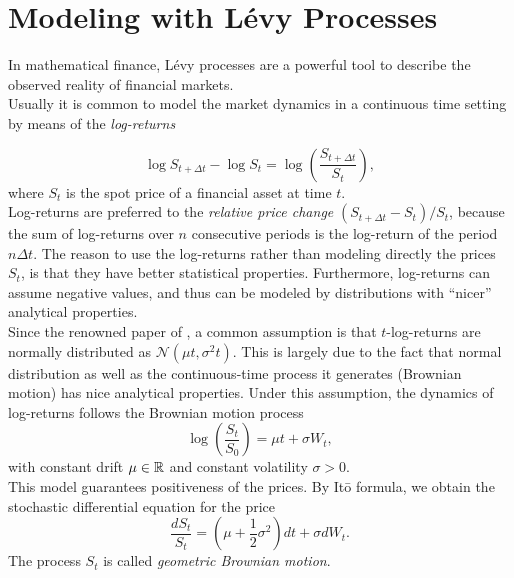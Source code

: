 

\chapter{Modeling with Lévy Processes}\label{Chapter1}
\minitoc%


\vspace{5em}

In mathematical finance, Lévy processes are a powerful tool to describe the observed reality of financial markets.\\ 
Usually it is common to model the market dynamics in a continuous time setting by means of the \emph{log-returns}

\begin{equation}
 \log S_{t+\Delta t} - \log S_t = \log \left(\frac{S_{t+\Delta t}}{S_t}\right),
\end{equation}
where $S_t$ is the spot price of a financial asset at time $t$.\\
Log-returns are preferred to the \emph{relative price change} $(S_{t+\Delta t} - S_t )/S_t$, because the sum of log-returns 
over $n$ consecutive periods is the log-return of the period $n \Delta t$.
The reason to use the log-returns rather than modeling directly the prices $S_t$, is that they have better statistical properties.
Furthermore, log-returns can assume negative values, and thus can be modeled by distributions
with ``nicer'' analytical properties.\\
Since the renowned paper of \cite{BS73}, a common assumption is that $t$-log-returns are 
normally distributed as $\mathcal{N}(\mu t,\sigma^2 t)$. 
This is largely due to the fact that normal distribution as well as the continuous-time process
it generates (Brownian motion) has nice analytical properties.
Under this assumption, the dynamics  of log-returns follows the Brownian motion process
\begin{equation}\label{GBM}
 \log \left( \frac{S_t}{S_0} \right) = \mu t + \sigma W_t ,
\end{equation}
with constant drift $\mu \in \mathbb{R}$ and constant volatility $\sigma >0$.\\
This model guarantees positiveness of the prices. By It\={o} formula, we obtain the stochastic differential equation for the price
\begin{equation}\label{GBM_sde}
 \frac{d S_t}{S_t} = (\mu + \frac{1}{2} \sigma^2) d t + \sigma dW_t  .
\end{equation}
The process $S_t$ is called \emph{geometric Brownian motion}.\\
